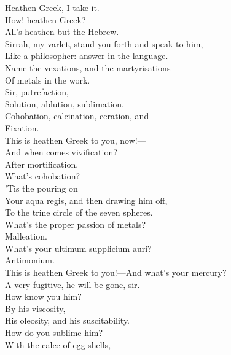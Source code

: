 \documentclass[a4paper,oneside]{memoir}
\begin{document}
\begin{drama*}
\ananiasspeaks {} Heathen Greek, I take it.\\
\subtlespeaks How! heathen Greek?\\
\ananiasspeaks {} All's heathen but the Hebrew.\\
\subtlespeaks Sirrah, my varlet, stand you forth and speak to him,\\
Like a philosopher: answer in the language.\\
Name the vexations, and the martyrisations\\
Of metals in the work.\\
\facespeaks {} Sir, putrefaction,\\
Solution, ablution, sublimation,\\
Cohobation, calcination, ceration, and\\
Fixation.\\
\subtlespeaks {} This is heathen Greek to you, now!---\\
And when comes vivification?\\
\facespeaks {} After mortification.\\
\subtlespeaks What's cohobation?\\
\facespeaks {} 'Tis the pouring on\\
Your aqua regis, and then drawing him off,\\
To the trine circle of the seven spheres.\\
\subtlespeaks What's the proper passion of metals?\\
\facespeaks {} Malleation.\\
\subtlespeaks What's your ultimum supplicium auri?\\
\facespeaks Antimonium.\\
\subtlespeaks {} This is heathen Greek to you!---And what's your mercury?\\
\facespeaks A very fugitive, he will be gone, sir.\\
\subtlespeaks How know you him?\\
\facespeaks {} By his viscosity,\\
His oleosity, and his suscitability.\\
\subtlespeaks How do you sublime him?\\
\facespeaks {} With the calce of egg-shells,\\

\end{drama*}
\end{document}
